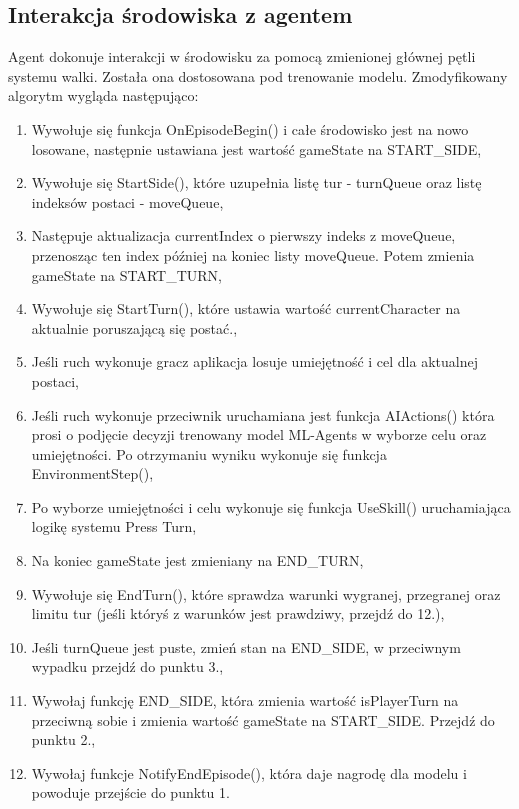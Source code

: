 \documentclass{SGGW-thesis}
\begin{document}
\subsection{Interakcja środowiska z agentem}
Agent dokonuje interakcji w środowisku za pomocą zmienionej głównej pętli systemu walki. Została ona dostosowana pod trenowanie modelu. Zmodyfikowany algorytm wygląda następująco:
\begin{enumerate}
  \item{Wywołuje się funkcja OnEpisodeBegin() i całe środowisko jest na nowo losowane, następnie ustawiana jest wartość gameState na START\_SIDE},
  \item{Wywołuje się StartSide(), które uzupełnia listę tur - turnQueue oraz listę indeksów postaci - moveQueue},
  \item{Następuje aktualizacja currentIndex o pierwszy indeks z moveQueue, przenosząc ten index później na koniec listy moveQueue. Potem zmienia gameState na START\_TURN},
  \item{Wywołuje się StartTurn(), które ustawia wartość currentCharacter na aktualnie poruszającą się postać.},
  \item{Jeśli ruch wykonuje gracz aplikacja losuje umiejętność i cel dla aktualnej postaci},
  \item{Jeśli ruch wykonuje przeciwnik uruchamiana jest funkcja AIActions() która prosi o podjęcie decyzji trenowany model ML-Agents w wyborze celu oraz umiejętności. Po otrzymaniu wyniku wykonuje się funkcja EnvironmentStep()},
  \item{Po wyborze umiejętności i celu wykonuje się funkcja UseSkill() uruchamiająca logikę systemu Press Turn},
  \item{Na koniec gameState jest zmieniany na END\_TURN},
  \item{Wywołuje się EndTurn(), które sprawdza warunki wygranej, przegranej oraz limitu tur (jeśli któryś z warunków jest prawdziwy, przejdź do 12.)},
  \item{Jeśli turnQueue jest puste, zmień stan na END\_SIDE, w przeciwnym wypadku przejdź do punktu 3.},
  \item{Wywołaj funkcję END\_SIDE, która zmienia wartość isPlayerTurn na przeciwną sobie i zmienia wartość gameState na START\_SIDE. Przejdź do punktu 2.},
  \item{Wywołaj funkcje NotifyEndEpisode(), która daje nagrodę dla modelu i powoduje przejście do punktu 1.}
\end{enumerate}
\end{document}
